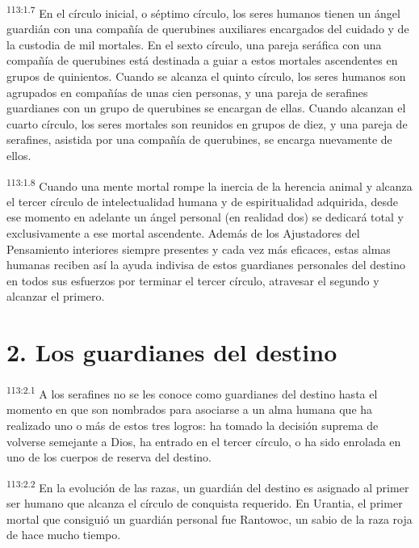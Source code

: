 \par
\textsuperscript{113:1.7} En el círculo inicial, o séptimo círculo, los seres humanos tienen un ángel guardián con una compañía de querubines auxiliares encargados del cuidado y de la custodia de mil mortales. En el sexto círculo, una pareja seráfica con una compañía de querubines está destinada a guiar a estos mortales ascendentes en grupos de quinientos. Cuando se alcanza el quinto círculo, los seres humanos son agrupados en compañías de unas cien personas, y una pareja de serafines guardianes con un grupo de querubines se encargan de ellas. Cuando alcanzan el cuarto círculo, los seres mortales son reunidos en grupos de diez, y una pareja de serafines, asistida por una compañía de querubines, se encarga nuevamente de ellos.

\par
\textsuperscript{113:1.8} Cuando una mente mortal rompe la inercia de la herencia animal y alcanza el tercer círculo de intelectualidad humana y de espiritualidad adquirida, desde ese momento en adelante un ángel personal (en realidad dos) se dedicará total y exclusivamente a ese mortal ascendente. Además de los Ajustadores del Pensamiento interiores siempre presentes y cada vez más eficaces, estas almas humanas reciben así la ayuda indivisa de estos guardianes personales del destino en todos sus esfuerzos por terminar el tercer círculo, atravesar el segundo y alcanzar el primero.

\section*{2. Los guardianes del destino}
\par
\textsuperscript{113:2.1} A los serafines no se les conoce como guardianes del destino hasta el momento en que son nombrados para asociarse a un alma humana que ha realizado uno o más de estos tres logros: ha tomado la decisión suprema de volverse semejante a Dios, ha entrado en el tercer círculo, o ha sido enrolada en uno de los cuerpos de reserva del destino.

\par
\textsuperscript{113:2.2} En la evolución de las razas, un guardián del destino es asignado al primer ser humano que alcanza el círculo de conquista requerido. En Urantia, el primer mortal que consiguió un guardián personal fue Rantowoc, un sabio de la raza roja de hace mucho tiempo.

